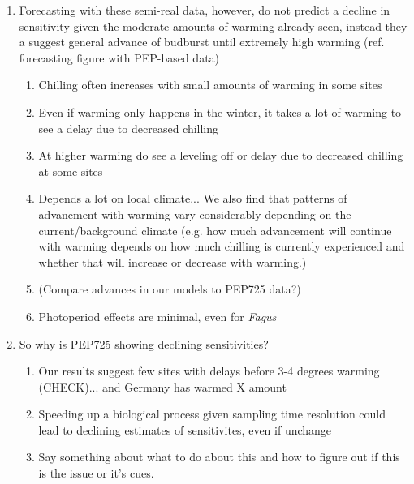 \documentclass[11pt,letter]{article}
\begin{document}
\begin{enumerate}
\item Forecasting with these semi-real data, however, do not predict a decline in sensitivity given the moderate amounts of warming already seen, instead they a suggest general advance of budburst until extremely high warming (ref. forecasting figure with PEP-based data)

\begin{enumerate}
\item Chilling often increases with small amounts of warming in some sites
\item Even if warming only happens in the winter, it takes a lot of warming to see a delay due to decreased chilling
\item At higher warming do see a leveling off or delay due to decreased chilling at some sites
\item Depends a lot on local climate... We also find that patterns of advancment with warming vary considerably depending on the current/background climate (e.g. how much advancement will continue with warming depends on how much chilling is currently experienced and whether that will increase or decrease with warming.)
\item (Compare advances in our models to PEP725 data?)
\item Photoperiod effects are minimal, even for \emph{Fagus}
\end{enumerate}

\item So why is PEP725 showing declining sensitivities?

\begin{enumerate}
\item Our results suggest few sites with delays before 3-4 degrees warming (CHECK)... and Germany has warmed X amount
\item Speeding up a biological process given sampling time resolution could lead to declining estimates of sensitivites, even if unchange
\item Say something about what to do about this and how to figure out if this is the issue or it's cues. 
\end{enumerate}


\end{enumerate}
\end{document}

